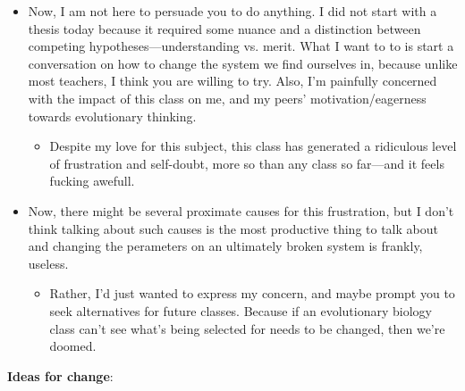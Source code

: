 \documentclass[12pt,a4paper]{article}
\begin{document}
\begin{itemize}
\begin{itemize}
\begin{itemize}
                    \end{itemize}
            \end{itemize}
        \item Now, I am not here to persuade you to do anything. I did not start with a thesis today because it required some nuance and a distinction between competing hypotheses---understanding vs. merit. What I want to to is start a conversation on how to change the system we find ourselves in, because unlike most teachers, I think you are willing to try. Also, I'm painfully concerned with the impact of this class on me, and my peers' motivation/eagerness towards evolutionary thinking. 
            \begin{itemize}
                \item Despite my love for this subject, this class has generated a ridiculous level of frustration and self-doubt, more so than any class so far---and it feels fucking awefull.
            \end{itemize}
        \item Now, there might be several proximate causes for this frustration, but I don't think talking about such causes is the most productive thing to talk about and changing the perameters on an ultimately broken system is frankly, useless.
            \begin{itemize}
                \item Rather, I'd just wanted to express my concern, and maybe prompt you to seek alternatives for future classes. Because if an evolutionary biology class can't see what's being selected for needs to be changed, then we're doomed.
            \end{itemize}
    \end{itemize}
\textbf{Ideas for change}:
\end{document}
